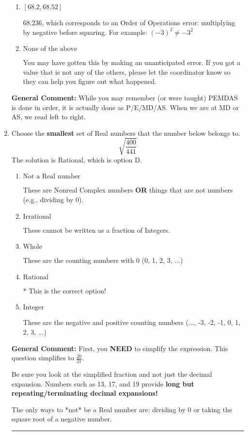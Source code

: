\documentclass{extbook}[14pt]
\newcommand{\litem}[1]{\item #1

\rule{\textwidth}{0.4pt}}
\begin{document}
\begin{enumerate}
{\begin{enumerate}[label=\Alph*.]
 -59.974, which corresponds to an Order of Operations error: not reading left-to-right for multiplication/division.
\item \( [68.2, 68.52] \)

 68.236, which corresponds to an Order of Operations error: multiplying by negative before squaring. For example: $(-3)^2 \neq -3^2$
\item \( \text{None of the above} \)

 You may have gotten this by making an unanticipated error. If you got a value that is not any of the others, please let the coordinator know so they can help you figure out what happened.
\end{enumerate}

\textbf{General Comment:} While you may remember (or were taught) PEMDAS is done in order, it is actually done as P/E/MD/AS. When we are at MD or AS, we read left to right.
}
\litem{
Choose the \textbf{smallest} set of Real numbers that the number below belongs to.
\[ \sqrt{\frac{400}{441}} \]
The solution is \( \text{Rational} \), which is option D.\begin{enumerate}[label=\Alph*.]
\item \( \text{Not a Real number} \)

These are Nonreal Complex numbers \textbf{OR} things that are not numbers (e.g., dividing by 0).
\item \( \text{Irrational} \)

These cannot be written as a fraction of Integers.
\item \( \text{Whole} \)

These are the counting numbers with 0 (0, 1, 2, 3, ...)
\item \( \text{Rational} \)

* This is the correct option!
\item \( \text{Integer} \)

These are the negative and positive counting numbers (..., -3, -2, -1, 0, 1, 2, 3, ...)
\end{enumerate}

\textbf{General Comment:} First, you \textbf{NEED} to simplify the expression. This question simplifies to $\frac{20}{21}$. 
 
 Be sure you look at the simplified fraction and not just the decimal expansion. Numbers such as 13, 17, and 19 provide \textbf{long but repeating/terminating decimal expansions!} 
 
 The only ways to *not* be a Real number are: dividing by 0 or taking the square root of a negative number. 
 
}
\end{enumerate}
\end{document}
